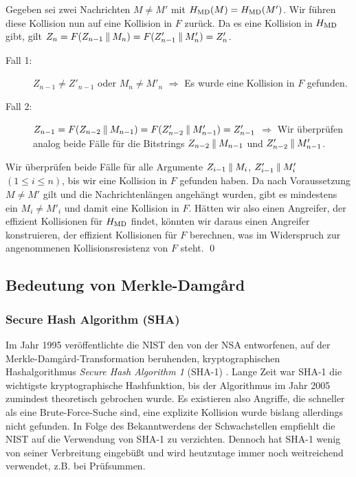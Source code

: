 \begin{beweis}\label{md-proof}
Gegeben sei zwei Nachrichten $M \neq M'$ mit $H_{\textnormal{MD}}(M) = H_{\textnormal{MD}}(M')$. Wir führen diese Kollision nun auf eine Kollision in $F$ zurück. 
Da es eine Kollision in $H_{\textnormal{MD}}$ gibt, gilt $Z_{n} = F(Z_{n-1} \mathbin{\|} M_{n}) = F(Z'_{n-1} \mathbin{\|} M'_{n}) = Z'_{n}$.
\begin{description}
	\item[Fall 1:] $Z_{n-1} \neq Z'_{n-1}$ oder $M_{n} \neq M'_{n}$ $\Rightarrow$ Es wurde eine Kollision in $F$ gefunden. 
	\item[Fall 2:] $Z_{n-1} = F(Z_{n-2} \mathbin{\|} M_{n-1}) = F(Z'_{n-2} \mathbin{\|} M'_{n-1}) = Z'_{n-1}$ $\Rightarrow$ Wir überprüfen analog beide Fälle für die Bitstrings $Z_{n-2} \mathbin{\|} M_{n-1}$ und $Z'_{n-2} \mathbin{\|} M'_{n-1}$.
\end{description}
Wir überprüfen beide Fälle für alle Argumente $Z_{i-1} \mathbin{\|} M_{i}$, $Z'_{i-1} \mathbin{\|} M'_{i}$ $(1 \leq i \leq n)$, bis wir eine Kollision in $F$ gefunden haben. Da nach Voraussetzung $M \neq M'$ gilt und die Nachrichtenlängen angehängt wurden, gibt es mindestens ein $M_{i} \neq M'_{i}$ und damit eine Kollision in $F$.
Hätten wir also einen Angreifer, der effizient Kollisionen für $H_\textnormal{MD}$
findet, könnten wir daraus einen Angreifer konstruieren, der effizient
Kollisionen für $F$ berechnen, was im Widerspruch zur angenommenen
Kollisionsresistenz von $F$ steht.
\qed
\end{beweis}

\subsection{Bedeutung von Merkle-Damgård}
\subsubsection{Secure Hash Algorithm (SHA)}
Im Jahr 1995 veröffentlichte die NIST den von der NSA entworfenen, auf der Merkle-Damgård-Transformation beruhenden, kryptographischen Hashalgorithmus \emph{Secure Hash Algorithm 1} (SHA-1) \cite{NIST_SHA95}. Lange Zeit war SHA-1 die wichtigste kryptographische Hashfunktion, bis der Algorithmus im Jahr 2005 zumindest theoretisch gebrochen wurde. Es existieren also Angriffe, die schneller als eine Brute-Force-Suche sind, eine explizite Kollision wurde bislang allerdings nicht gefunden. In Folge des Bekanntwerdens der Schwachstellen empfiehlt die NIST auf die Verwendung von SHA-1 zu verzichten. Dennoch hat SHA-1 wenig von seiner Verbreitung eingebüßt und wird heutzutage immer noch weitreichend verwendet, z.B. bei Prüfsummen.

